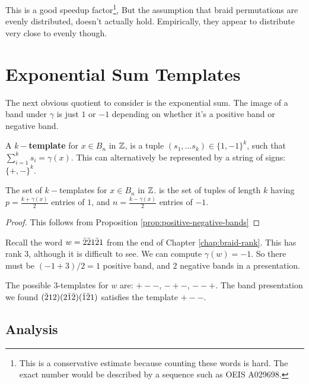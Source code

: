 \documentclass[12pt]{thesis}
\begin{document}
This is a good speedup factor\footnote{This is a conservative estimate because counting these words is hard.
              The exact number would be described by a sequence such as OEIS A029698\cite{oeis}.},
But the assumption that braid permutations are evenly distributed,
doesn't actually hold. Empirically, they appear to distribute very close to evenly though.

\section{Exponential Sum Templates}

The next obvious quotient to consider is the exponential sum.
The image of a band under $\gamma$ is just $1$ or $-1$ depending
on whether it's a positive band or negative band.

\begin{definition}
    A \textbf{$k-$template} for $x \in B_{n}$ in $\mathbb{Z}$,
    is a tuple $(s_{1}, \ldots s_{k}) \in \{ 1, -1 \}^{k}$,
    such that $\sum_{i=1}^{k} s_{i} = \gamma(x)$.
    This can alternatively be represented by a string of signs: $\{ +, - \}^{k}$.
\end{definition}

\begin{proposition}
    The set of $k-$templates for $x \in B_{n}$
    in $\mathbb{Z}$.
    is the set of tuples of length $k$
    having $p = \frac{k + \gamma(x)}{2}$ entries of $1$,
    and $n = \frac{k - \gamma(x)}{2}$ entries of $-1$.
\end{proposition}

\begin{proof}
    This follows from Proposition \ref{prop:positive-negative-bands}
\end{proof}

\begin{example}
    Recall the word $w = \bar{2}\bar{2} 1 \bar{2} 1$ from the end
    of Chapter \ref{chap:braid-rank}.
    This has rank $3$, although it is difficult to see.
    We can compute $\gamma(w) = -1$.
    So there must be $(-1 + 3)/2 = 1$ positive band,
    and $2$ negative bands in a presentation.
    
    The possible $3$-templates for $w$ are:
    $+ - -$, $- + -$, $- - +$.
    The band presentation we found $(\bar{2} 1 2) (2 \bar{1} \bar{2}) (\bar{1} \bar{2} 1)$
    satisfies the template $+ - -$.
\end{example}

\subsection{Analysis}
\end{document}
